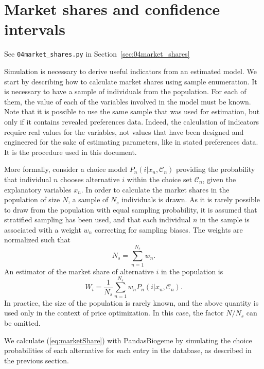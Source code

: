 \documentclass[12pt,a4paper]{article}
\newcommand{\req}[1]{(\ref{#1})}
\newcommand{\C}{\mathcal{C}}
\begin{document}
\section{Market shares and confidence intervals}

\begin{flushright}
See \lstinline$04market_shares.py$ in Section~\ref{sec:04market_shares}
\end{flushright}

Simulation is necessary to derive useful
indicators from an estimated model. We start by describing how to calculate market shares using
sample enumeration. It is necessary to have a sample of individuals
from the population. For each of them, the value of each of the
variables involved in the model must be known.  Note that it is possible to use the same sample
that was used for estimation, but only if it contains revealed
preferences data. Indeed, the calculation of indicators require real
values for the variables, not values that have been designed and engineered for the
sake of estimating parameters, like in stated preferences data. It is the procedure used in this document.

More formally, consider a choice model $P_n(i|x_n, \C_n)$ providing
the probability that individual $n$ chooses alternative $i$ within the
choice set $\C_n$, given the explanatory variables $x_n$.  In order to
calculate the market shares in the population of size $N$, a sample of
$N_s$ individuals is drawn. As it is rarely possible to draw from the
population with equal sampling probability, it is assumed that
stratified sampling has been used, and that each individual $n$ in the
sample is associated with a weight $w_n$ correcting for sampling
biases. The weights are normalized such that
\begin{equation}
  \label{eq:normalizingWeights}
N_s = \sum_{n=1}^{N_s} w_n.
\end{equation}
An estimator of the market share of alternative $i$ in the population is
\begin{equation}
  \label{eq:marketShare}
W_i = \frac{1}{N_s} \sum_{n=1}^{N_s} w_n P_n(i|x_n, \C_n).
\end{equation}
In practice, the size of the population is rarely known, and the above
quantity is used only in the context of price optimization. In this
case, the factor $N/N_s$ can be omitted.

We calculate \req{eq:marketShare} with
PandasBiogeme by simulating the choice probabilities of each
alternative for each entry in the database, as described in the
previous section.
\end{document}
